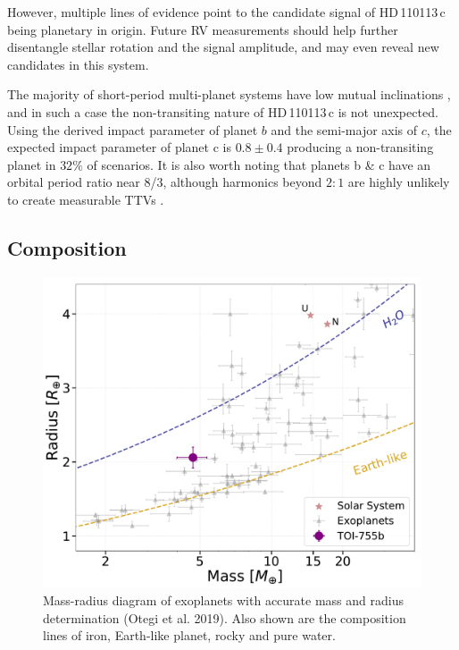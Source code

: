 \documentclass[fleqn,usenatbib]{mnras}
\newcommand{\Tplanetc}{HD\,110113\,c}
\begin{document}
However, multiple lines of evidence point to the candidate signal of \Tplanetc{} being planetary in origin.
Future RV measurements should help further disentangle stellar rotation and the signal amplitude, and may even reveal new candidates in this system.

The majority of short-period multi-planet systems have low mutual inclinations \citep{lissauer2011architecture}, and in such a case the non-transiting nature of \Tplanetc{} is not unexpected.
Using the derived impact parameter of planet $b$ and the semi-major axis of $c$, the expected impact parameter of planet c is $0.8\pm0.4$ producing a non-transiting planet in $32\%$ of scenarios.
It is also worth noting that planets b \& c have an orbital period ratio near 8/3, although harmonics beyond $2:1$ are highly unlikely to create measurable TTVs \citep{deck2015measurement}.

\subsection{Composition}\label{sect:internal}

\begin{figure}
	\includegraphics[width=\columnwidth]{MR_755_Jon}
    \caption{Mass-radius diagram of exoplanets with accurate mass and radius determination (Otegi et al. 2019). Also shown are the composition lines of iron, Earth-like planet, rocky and pure water.}
    \label{fig:MR_Diagram}
\end{figure}
\end{document}
